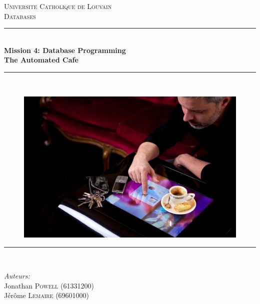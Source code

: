 \documentclass[a4paper,10pt]{article}
\newcommand{\HRule}{\rule{\linewidth}{0.5mm}}
\begin{document}
\begin{titlepage}

  \begin{center}


    \textsc{\Large Universite Catholique de Louvain}\\[1cm]

    \textsc{\LARGE{Databases}}\\[1cm]


    \HRule \\[0.35cm]
    {\huge \bfseries Mission 4: Database Programming \\ The Automated Cafe}\\
    \HRule \\[0.35cm]
        \end{center}
      \begin{figure}[h!]
      \begin{center}
       \includegraphics[scale=0.6]{restaurant.jpg}
      \end{center}
      \end{figure}

    \begin{center}
    \HRule \\[0.2cm]
  \end{center}

    \begin{minipage}{0.48\textwidth}
      \begin{flushleft} \large
        \textit{Auteurs:}\\
        Jonathan \textsc{Powell} (61331200)\\ \vspace{0.3cm}
        Jérôme \textsc{Lemaire} (69601000)\\ \vspace{0.3cm}


\end{flushleft}
\end{minipage}
\end{titlepage}
\end{document}
